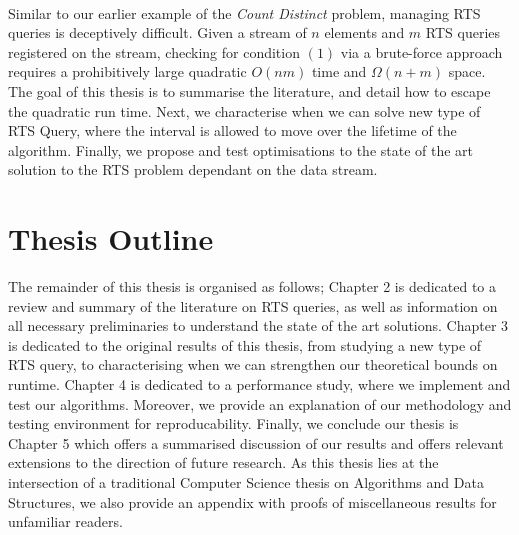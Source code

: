 \\
Similar to our earlier example of the \textit{Count Distinct} problem, managing RTS queries is deceptively difficult. Given a stream of $n$ elements and $m$ RTS queries registered on the stream, checking for condition $(1)$ via a brute-force approach requires a prohibitively large quadratic $O(nm)$ time and $\Omega(n+m)$ space. The goal of this thesis is to summarise the literature, and detail how to escape the quadratic run time. Next, we characterise when we can solve new type of RTS Query, where the interval is allowed to move over the lifetime of the algorithm. Finally, we propose and test optimisations to the state of the art solution to the RTS problem dependant on the data stream.

\section{Thesis Outline}

The remainder of this thesis is organised as follows; Chapter 2 is dedicated to a review and summary of the literature on RTS queries, as well as information on all necessary preliminaries to understand the state of the art solutions. Chapter 3 is dedicated to the original results of this thesis, from studying a new type of RTS query, to characterising when we can strengthen our theoretical bounds on runtime. Chapter 4 is dedicated to a performance study, where we implement and test our algorithms. Moreover, we provide an explanation of our methodology and testing environment for reproducability. Finally, we conclude our thesis is Chapter 5 which offers a summarised discussion of our results and offers relevant extensions to the direction of future research. As this thesis lies at the intersection of a traditional Computer Science thesis on Algorithms and Data Structures, we also provide an appendix with proofs of miscellaneous results for unfamiliar readers. 

